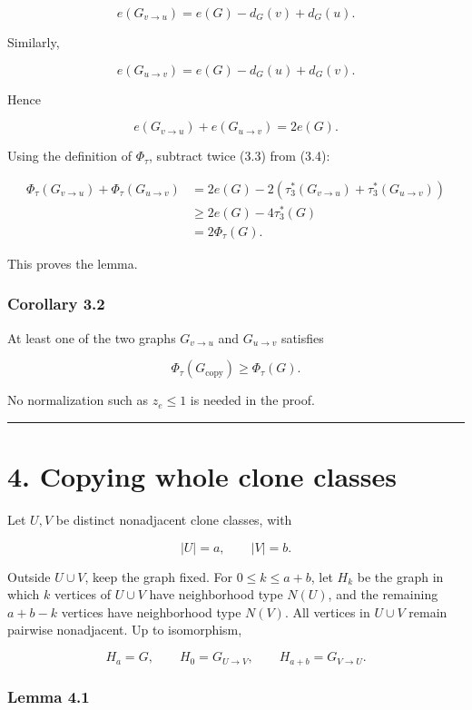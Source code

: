 \documentclass[
  11pt,
]{article}
\begin{document}
\[
e(G_{v\to u})
=
e(G)-d_G(v)+d_G(u).
\]

Similarly,

\[
e(G_{u\to v})
=
e(G)-d_G(u)+d_G(v).
\]

Hence

\[
e(G_{v\to u})+e(G_{u\to v})=2e(G).
\tag{3.4}
\]

Using the definition of \(\Phi_\tau\), subtract twice (3.3) from (3.4):

\[
\begin{aligned}
\Phi_\tau(G_{v\to u})
+
\Phi_\tau(G_{u\to v})
&=
2e(G)
-
2\left(
\tau_3^*(G_{v\to u})
+
\tau_3^*(G_{u\to v})
\right)\\
&\ge
2e(G)-4\tau_3^*(G)\\
&=
2\Phi_\tau(G).
\end{aligned}
\]

This proves the lemma.

\subsubsection{Corollary 3.2}\label{corollary-3.2}

At least one of the two graphs \(G_{v\to u}\) and \(G_{u\to v}\)
satisfies

\[
\Phi_\tau(G_{\mathrm{copy}})\ge\Phi_\tau(G).
\]

No normalization such as \(z_e\le1\) is needed in the proof.

\begin{center}\rule{0.5\linewidth}{0.5pt}\end{center}

\section{4. Copying whole clone
classes}\label{copying-whole-clone-classes}

Let \(U,V\) be distinct nonadjacent clone classes, with

\[
|U|=a,
\qquad
|V|=b.
\]

Outside \(U\cup V\), keep the graph fixed. For \(0\le k\le a+b\), let
\(H_k\) be the graph in which \(k\) vertices of \(U\cup V\) have
neighborhood type \(N(U)\), and the remaining \(a+b-k\) vertices have
neighborhood type \(N(V)\). All vertices in \(U\cup V\) remain pairwise
nonadjacent. Up to isomorphism,

\[
H_a=G,
\qquad
H_0=G_{U\to V},
\qquad
H_{a+b}=G_{V\to U}.
\]

\subsubsection{Lemma 4.1}\label{lemma-4.1}
\end{document}
